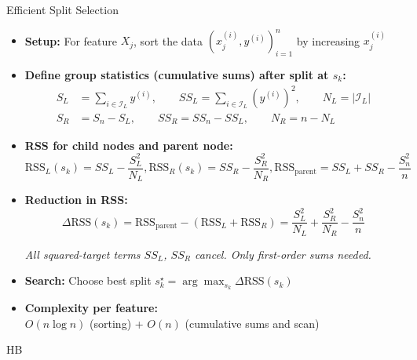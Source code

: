 \documentclass[10pt,compress,t,notes=noshow, xcolor=table]{beamer}
\begin{document}
\begin{frame}{Efficient Split Selection}
\begin{itemize}
  \item \textbf{Setup:} For feature \(X_j\), sort the data \((x_j^{(i)}, y^{(i)})_{i=1}^n\) by increasing \(x_j^{(i)}\)


  \item \textbf{Define group statistics (cumulative sums) after split at $s_k$:}
      \[
    \begin{aligned}
      S_L &= \textstyle\sum_{i \in \mathcal{I}_L} y^{(i)}, \qquad
      SS_L = \sum_{i \in \mathcal{I}_L} (y^{(i)})^2, \qquad
      N_L = |\mathcal{I}_L| \\
      S_R &= \textstyle S_n - S_L, \qquad
      SS_R = SS_n - SS_L, \qquad
      N_R = n - N_L
    \end{aligned}
    \]

  \item \textbf{RSS for child nodes and parent node:}
    \[
      \text{RSS}_L(s_k) = SS_L - \frac{S_L^2}{N_L}, 
      \text{RSS}_R(s_k) = SS_R - \frac{S_R^2}{N_R}, 
      \text{RSS}_{\text{parent}} = SS_L + SS_R - \frac{S_n^2}{n}
    \]
  \item<2-> \textbf{Reduction in RSS:}
    \[
      \Delta\text{RSS}(s_k) = \text{RSS}_{\text{parent}} - (\text{RSS}_L + \text{RSS}_R)
      = \frac{S_L^2}{N_L} + \frac{S_R^2}{N_R} - \frac{S_n^2}{n}
    \]

    \emph{All squared-target terms \( SS_L \), \( SS_R \) cancel. Only first-order sums needed.}

  \item<2-> \textbf{Search:} Choose best split \(s_k^\star = \arg\max_{s_k} \Delta\text{RSS}(s_k)\)

  \item<2-> \textbf{Complexity per feature:}\\\; \(O(n\log n)\) (sorting) + \(O(n)\) (cumulative sums and scan)
\end{itemize}
 HB\end{frame}
\end{document}

